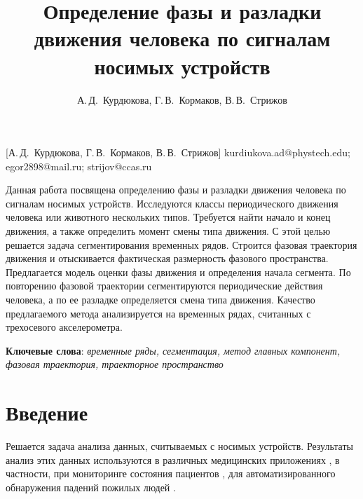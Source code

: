\documentclass[12pt, twoside]{article}
\begin{document}
\title
    [] %
    {Определение фазы и разладки движения человека по сигналам носимых устройств}
\author
    [А.\,Д.~Курдюкова] %
    {А.\,Д.~Курдюкова, Г.\,В.~Кормаков, В.\,В.~Стрижов} %
    [А.\,Д.~Курдюкова, Г.\,В.~Кормаков, В.\,В.~Стрижов] %
\email
   {kurdiukova.ad@phystech.edu; egor2898@mail.ru; strijov@ccas.ru}
\abstract
  {Данная работа посвящена определению фазы и разладки движения человека по сигналам носимых устройств. Исследуются классы периодического движения человека или животного нескольких типов. Требуется найти начало и конец движения, а также определить момент смены типа движения. С этой целью решается задача сегментирования временных рядов. Строится фазовая траектория движения и отыскивается фактическая размерность фазового пространства. Предлагается модель оценки фазы движения и определения начала сегмента. По повторению фазовой траектории сегментируются периодические действия человека, а по ее разладке определяется смена типа движения. Качество предлагаемого метода анализируется на временных рядах, считанных с трехосевого акселерометра.

\bigskip
\noindent
\textbf{Ключевые слова}: \emph {временные ряды, сегментация, метод главных компонент, фазовая траектория, траекторное пространство}
}

\doi{}
\receivedRus{}
\receivedEng{}

\maketitle
\linenumbers

\section{Введение}
Решается задача анализа данных, считываемых с носимых устройств. Результаты анализ этих данных используются в различных медицинских приложениях \cite{bussmann1998ambulatory, najafi2003ambulatory}, в частности, при мониторинге состояния пациентов \cite{grunerbl2014smartphone}, для автоматизированного обнаружения падений пожилых людей \cite{ma2014depth}.
\end{document}
